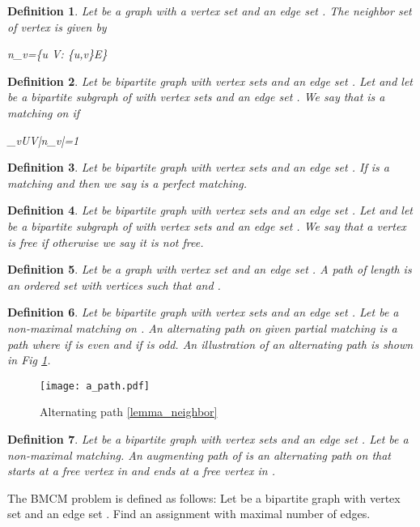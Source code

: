 \documentclass[11pt,onecolumn]{article}
\newcounter{theorem}
\newcounter{definition}
\newtheorem{definition}{Definition}
\newcommand{\beq}{}
\begin{document}
\begin{definition}
Let  be a graph with a vertex set  and an edge set . The neighbor set of vertex  is given by
\beq
n_v=\left\{u \in V: \{u,v\}\in E\right\}
\eeq
\end{definition}
\begin{definition}
Let  be bipartite graph with vertex sets  and an edge set . Let  and let  be a bipartite subgraph of  with vertex sets  and an edge set . We say that  is a matching on  if
\beq
\max_{v\in U\cup V}|n_v|=1
\eeq
\end{definition}
\begin{definition} Let  be bipartite graph with vertex sets  and an edge set . If  is a matching and  then we say  is a perfect matching.
\end{definition}
\begin{definition}
Let  be bipartite graph with vertex sets  and an edge set . Let  and let  be a bipartite subgraph of  with vertex sets  and an edge set .
We say that a vertex  is free if  otherwise we say it is not free.
\end{definition}
\begin{definition}
 Let  be a graph with vertex set  and an edge set . A \emph{path}  of length  is an ordered set with  vertices  such that  and .
\end{definition}
\begin{definition}
Let  be bipartite graph with vertex sets  and an edge set . Let  be a non-maximal matching on .  An \emph{alternating path}  on  given partial matching  is a path where  if  is even and  if  is odd. An illustration of an alternating path is shown in Fig \ref{figure_alternating_path}.
\end{definition}
\begin{figure}[htbp]
\centering \texttt{[image: a\_path.pdf]}
\caption{Alternating path \ref{lemma_neighbor} }
\label{figure_alternating_path}
\end{figure}
\begin{definition}
Let  be a bipartite graph with vertex sets  and an edge set . Let  be a non-maximal matching. An \emph{augmenting path} of  is an alternating path on  that starts at a free vertex in  and ends at a free vertex in .
\end{definition}
The BMCM problem is defined as follows:
 Let  be a bipartite graph with vertex set  and an edge set . Find an assignment  with maximal number of edges.
\end{document}
